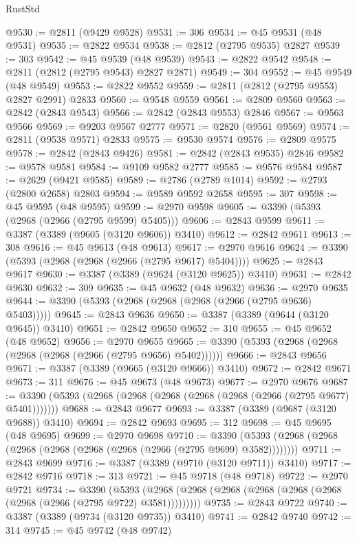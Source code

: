 \begin{lexlean}{RustStd}
\begin{coremodule}
{\begin{coremodule}
{{{{{{{{{{{{{{{{{{{{{{{{{{{{{{{{{@9530 := @2811 (@9429 @9528)
@9531 := 306
@9534 := @45 @9531 (@48 @9531)
@9535 := @2822 @9534
@9538 := @2812 (@2795 @9535) @2827
@9539 := 303
@9542 := @45 @9539 (@48 @9539)
@9543 := @2822 @9542
@9548 := @2811 (@2812 (@2795 @9543) @2827 @2871)
@9549 := 304
@9552 := @45 @9549 (@48 @9549)
@9553 := @2822 @9552
@9559 := @2811 (@2812 (@2795 @9553) @2827 @2991) @2833
@9560 := @9548 @9559
@9561 := @2809 @9560
@9563 := @2842 (@2843 @9543)
@9566 := @2842 (@2843 @9553) @2846
@9567 := @9563 @9566
@9569 := @9203 @9567 @2777
@9571 := @2820 (@9561 @9569)
@9574 := @2811 (@9538 @9571) @2833
@9575 := @9530 @9574
@9576 := @2809 @9575
@9578 := @2842 (@2843 @9426)
@9581 := @2842 (@2843 @9535) @2846
@9582 := @9578 @9581
@9584 := @9109 @9582 @2777
@9585 := @9576 @9584
@9587 := @2629 (@9421 @9585)
@9589 := @2786 (@2789 @1014)
@9592 := @2793 (@2800 @2658) @2803
@9594 := @9589 @9592 @2658
@9595 := 307
@9598 := @45 @9595 (@48 @9595)
@9599 := @2970 @9598
@9605 := @3390 (@5393 (@2968 (@2966 (@2795 @9599) @5405)))
@9606 := @2843 @9599
@9611 := @3387 (@3389 (@9605 (@3120 @9606)) @3410)
@9612 := @2842 @9611
@9613 := 308
@9616 := @45 @9613 (@48 @9613)
@9617 := @2970 @9616
@9624 := @3390 (@5393 (@2968 (@2968 (@2966 (@2795 @9617) @5404))))
@9625 := @2843 @9617
@9630 := @3387 (@3389 (@9624 (@3120 @9625)) @3410)
@9631 := @2842 @9630
@9632 := 309
@9635 := @45 @9632 (@48 @9632)
@9636 := @2970 @9635
@9644 := @3390 (@5393 (@2968 (@2968 (@2968 (@2966 (@2795 @9636) @5403)))))
@9645 := @2843 @9636
@9650 := @3387 (@3389 (@9644 (@3120 @9645)) @3410)
@9651 := @2842 @9650
@9652 := 310
@9655 := @45 @9652 (@48 @9652)
@9656 := @2970 @9655
@9665 := @3390 (@5393 (@2968 (@2968 (@2968 (@2968 (@2966 (@2795 @9656) @5402))))))
@9666 := @2843 @9656
@9671 := @3387 (@3389 (@9665 (@3120 @9666)) @3410)
@9672 := @2842 @9671
@9673 := 311
@9676 := @45 @9673 (@48 @9673)
@9677 := @2970 @9676
@9687 := @3390 (@5393 (@2968 (@2968 (@2968 (@2968 (@2968 (@2966 (@2795 @9677) @5401)))))))
@9688 := @2843 @9677
@9693 := @3387 (@3389 (@9687 (@3120 @9688)) @3410)
@9694 := @2842 @9693
@9695 := 312
@9698 := @45 @9695 (@48 @9695)
@9699 := @2970 @9698
@9710 := @3390 (@5393 (@2968 (@2968 (@2968 (@2968 (@2968 (@2968 (@2966 (@2795 @9699) @3582))))))))
@9711 := @2843 @9699
@9716 := @3387 (@3389 (@9710 (@3120 @9711)) @3410)
@9717 := @2842 @9716
@9718 := 313
@9721 := @45 @9718 (@48 @9718)
@9722 := @2970 @9721
@9734 := @3390
    (@5393 (@2968 (@2968 (@2968 (@2968 (@2968 (@2968 (@2968 (@2966 (@2795 @9722) @3581)))))))))
@9735 := @2843 @9722
@9740 := @3387 (@3389 (@9734 (@3120 @9735)) @3410)
@9741 := @2842 @9740
@9742 := 314
@9745 := @45 @9742 (@48 @9742)
}}}}}}}}}}}}}}}}}}}}}}}}}}}}}}}}}
\end{coremodule}}
\end{coremodule}
\end{lexlean}
